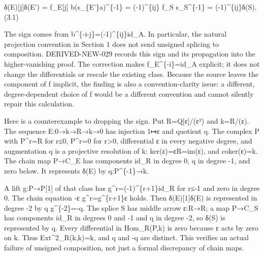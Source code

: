 δ(E)\allowbreak{}[j]\allowbreak{}δ(E')\allowbreak{} \allowbreak{}= f\_\allowbreak{}E[j]\allowbreak{} b(s\_\allowbreak{}\{E'\}a)\allowbreak{}\textasciicircum{}\{-1\} \allowbreak{}= (-1)\allowbreak{}\textasciicircum{}\{ij\} f\_\allowbreak{}S s\_\allowbreak{}S\textasciicircum{}\{-1\} \allowbreak{}= (-1)\allowbreak{}\textasciicircum{}\{ij\}δ(S)\allowbreak{}. (3.1)\allowbreak{}

The sign comes from b\textasciicircum{}\{-i-j\}\allowbreak{}=(-1)\allowbreak{}\textasciicircum{}\{ij\}id\_\allowbreak{}A. In particular,\allowbreak{} the natural projection convention in Section 1 does not send unsigned splicing to composition. DERIVED-NEW-029 records this sign and its propagation into the higher-vanishing proof. The correction makes f\_\allowbreak{}E\textasciicircum{}\{-i\}\allowbreak{}=id\_\allowbreak{}A explicit; it does not change the differentials or rescale the existing class. Because the source leaves the component of f implicit,\allowbreak{} the finding is also a convention-clarity issue:\allowbreak{} a different,\allowbreak{} degree-dependent choice of f would be a different convention and cannot silently repair this calculation.

Here is a counterexample to dropping the sign. Put R\allowbreak{}=Q[ε]\allowbreak{}/\allowbreak{}(ε²)\allowbreak{} and k\allowbreak{}=R/\allowbreak{}(ε)\allowbreak{}. The sequence E:\allowbreak{}0\allowbreak{}→k\allowbreak{}→R\allowbreak{}→k\allowbreak{}→0 has injection 1\allowbreak{}↦ε and quotient q. The complex P with P\textasciicircum{}r\allowbreak{}=R for r≤0,\allowbreak{} P\textasciicircum{}r\allowbreak{}=0 for r>0,\allowbreak{} differential ε in every negative degree,\allowbreak{} and augmentation q is a projective resolution of k:\allowbreak{} ker(ε)\allowbreak{}\allowbreak{}=εR\allowbreak{}=im(ε)\allowbreak{},\allowbreak{} and coker(ε)\allowbreak{}\allowbreak{}=k. The chain map P\allowbreak{}→C\_\allowbreak{}E has components id\_\allowbreak{}R in degree 0,\allowbreak{} q in degree -1,\allowbreak{} and zero below. It represents δ(E)\allowbreak{} by q:\allowbreak{}P\textasciicircum{}\{-1\}\allowbreak{}→k.

A lift g:\allowbreak{}P\allowbreak{}→P[1]\allowbreak{} of that class has g\textasciicircum{}r\allowbreak{}=(-1)\allowbreak{}\textasciicircum{}\{r\allowbreak{}+1\}id\_\allowbreak{}R for r≤-1 and zero in degree 0. The chain equation -ε g\textasciicircum{}r\allowbreak{}=g\textasciicircum{}\{r\allowbreak{}+1\}ε holds. Then δ(E)\allowbreak{}[1]\allowbreak{}δ(E)\allowbreak{} is represented in degree -2 by q g\textasciicircum{}\{-2\}\allowbreak{}=-q. The splice S has middle arrow ε:\allowbreak{}R\allowbreak{}→R; a map P\allowbreak{}→C\_\allowbreak{}S has components id\_\allowbreak{}R in degrees 0 and -1 and q in degree -2,\allowbreak{} so δ(S)\allowbreak{} is represented by q. Every differential in Hom\_\allowbreak{}R(P,\allowbreak{}k)\allowbreak{} is zero because ε acts by zero on k. Thus Ext\textasciicircum{}2\_\allowbreak{}R(k,\allowbreak{}k)\allowbreak{}\allowbreak{}=k,\allowbreak{} and q and -q are distinct. This verifies an actual failure of unsigned composition,\allowbreak{} not just a formal discrepancy of chain maps.

